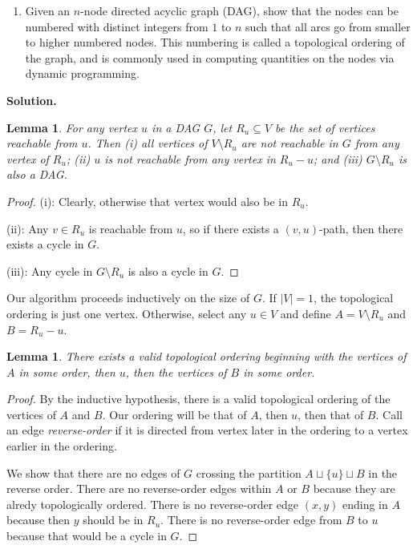 \documentclass[11pt,letterpaper]{article}
\newtheorem{lemma}[theorem]{Lemma}
\theoremstyle{definition}
\newcommand{\solution}{\medskip\noindent\textbf{Solution.}\par\medskip}
\begin{document}
\begin{enumerate}[resume=q]
\item Given an $n$-node directed acyclic graph (DAG), show that the nodes can be numbered with distinct integers from $1$ to $n$ such that all arcs go from smaller to higher numbered nodes. This numbering is called a topological ordering of the graph, and is commonly used in computing quantities on the nodes via dynamic programming.
\end{enumerate}

\solution

\begin{lemma}
    For any vertex $u$ in a DAG $G$, let $R_u\subseteq V$ be the set of vertices reachable from $u$. 
    Then (i) all vertices of $V\setminus R_u$ are not reachable in $G$ from any vertex of $R_u$; (ii) $u$ is not reachable from any vertex in $R_u - u$; and (iii) $G\setminus R_u$ is also a DAG.
\end{lemma}
\begin{proof}
    (i): Clearly, otherwise that vertex would also be in $R_u$.
    
    (ii): Any $v\in R_u$ is reachable from $u$, so if there exists a $(v,u)$-path, then there exists a cycle in $G$.

    (iii): Any cycle in $G\setminus R_u$ is also a cycle in $G$.
\end{proof}

Our algorithm proceeds inductively on the size of $G$.
If $|V|=1$, the topological ordering is just one vertex.
Otherwise, select any $u\in V$ and define $A = V\setminus R_u$ and $B = R_u - u$. 

\begin{lemma}
    There exists a valid topological ordering beginning with the vertices of $A$ in some order, then $u$, then the vertices of $B$ in some order.
\end{lemma}
\begin{proof}
    By the inductive hypothesis, there is a valid topological ordering of the vertices of $A$ and $B$.
    Our ordering will be that of $A$, then $u$, then that of $B$.
    Call an edge \emph{reverse-order} if it is directed from vertex later in the ordering to a vertex earlier in the ordering.

    We show that there are no edges of $G$ crossing the partition $A\sqcup \{u\} \sqcup B$ in the reverse order. 
    There are no reverse-order edges within $A$ or $B$ because they are alredy topologically ordered.
    There is no reverse-order edge $(x,y)$ ending in $A$ because then $y$ should be in $R_u$.
    There is no reverse-order edge from $B$ to $u$ because that would be a cycle in $G$.
\end{proof}
\end{document}
